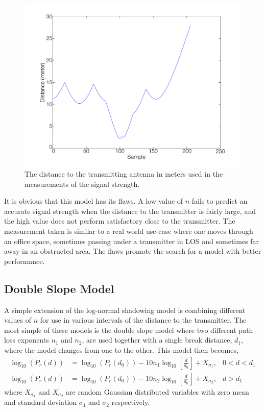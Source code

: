 \documentclass{LTHthesis}
\begin{document}
%
\begin{figure}[!hbt]

\includegraphics[width=1\textwidth ]{images/signal_model/dist_trans}
\caption{The distance to the transmitting antenna in meters used in the measurements of the signal strength.}\label{dist_trans}
\end{figure}

It is obvious that this model has its flaws. A low value of $n$ fails to predict an accurate signal strength when the distance to the transmitter is fairly large, and the high value does not perform satisfactory close to the transmitter. The measurement taken is similar to a real world use-case where one moves through an office space, sometimes passing under a transmitter in LOS and sometimes far away in an obstructed area. The flaws promote the search for a model with better performance.
%
\subsection{Double Slope Model}
%
A simple extension of the log-normal shadowing model is combining different values of $n$ for use in various intervals of the distance to the transmitter. The most simple of these models is the double slope model where two different path loss exponents $n_1$ and $n_2$, are used together with a single break distance, $d_1$, where the model changes from one to the other. This model then becomes,
\begin{subequations}
\begin{align}
\log_{10}({P_r(d)})&=\log_{10}({P_r(d_0)})-10n_1\log_{10}\left[{\frac{d}{d_0}}\right] + X_{\sigma_1}, & 0<d<d_1\\
\log_{10}({P_r(d)})&=\log_{10}({P_r(d_0)})-10n_2\log_{10}\left[{\frac{d}{d_0}}\right] + X_{\sigma_2}, & d>d_1
\end{align}
\end{subequations} 
where $X_{\sigma_1}$ and $X_{\sigma_2}$ are random Gaussian distributed variables with zero mean and standard deviation $\sigma_1$ and $\sigma_2$ respectively.
 
\end{document}
